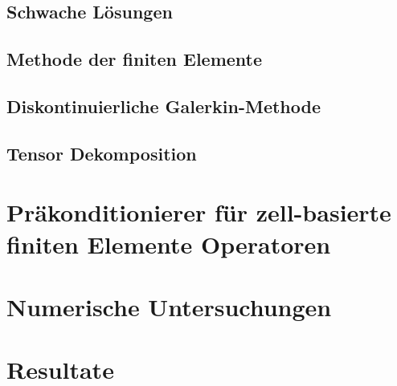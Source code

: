 \documentclass[12pt,a4paper]{scrartcl}
\numberwithin{equation}{section}
\begin{document}
\subsection{Schwache Lösungen}

\subsection{Methode der finiten Elemente}

\subsection{Diskontinuierliche Galerkin-Methode}

\subsection{Tensor Dekomposition}





\section{Präkonditionierer für zell-basierte finiten Elemente Operatoren }




\section{Numerische Untersuchungen}




\section{Resultate}





\newpage
\begin{thebibliography}{Lam00}
\end{thebibliography}
 



\end{document}
